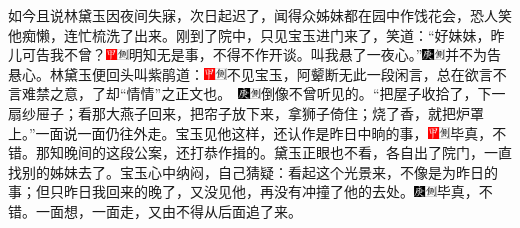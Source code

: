 如今且说林黛玉因夜间失寐，次日起迟了，闻得众姊妹都在园中作饯花会，恐人笑他痴懒，连忙梳洗了出来。刚到了院中，只见宝玉进门来了，笑道：``好妹妹，昨儿可告我不曾？{\includegraphics[width=3mm]{../Images/00002}\includegraphics[width=3mm]{../Images/00011}\footnotesize \kaishu 明知无是事，不得不作开谈。}叫我悬了一夜心。''{\includegraphics[width=3mm]{../Images/00004}\includegraphics[width=3mm]{../Images/00011}\footnotesize \kaishu 并不为告悬心。}林黛玉便回头叫紫鹃道：{\includegraphics[width=3mm]{../Images/00002}\includegraphics[width=3mm]{../Images/00011}\footnotesize \kaishu 不见宝玉，阿颦断无此一段闲言，总在欲言不言难禁之意，了却``情情''之正文也。　\includegraphics[width=3mm]{../Images/00004}\includegraphics[width=3mm]{../Images/00011}\footnotesize \kaishu 倒像不曾听见的。}``把屋子收拾了，下一扇纱屉子；看那大燕子回来，把帘子放下来，拿狮子倚住；烧了香，就把炉罩上。''一面说一面仍往外走。宝玉见他这样，还认作是昨日中晌的事，{\includegraphics[width=3mm]{../Images/00002}\includegraphics[width=3mm]{../Images/00011}\footnotesize \kaishu 毕真，不错。}那知晚间的这段公案，还打恭作揖的。黛玉正眼也不看，各自出了院门，一直找别的姊妹去了。宝玉心中纳闷，自己猜疑：看起这个光景来，不像是为昨日的事；但只昨日我回来的晚了，又没见他，再没有冲撞了他的去处。{\includegraphics[width=3mm]{../Images/00004}\includegraphics[width=3mm]{../Images/00011}\footnotesize \kaishu 毕真，不错。}一面想，一面走，又由不得从后面追了来。

